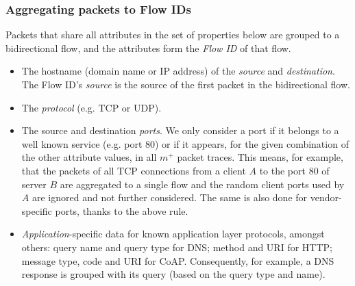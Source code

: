 
\subsubsection{Aggregating packets to Flow IDs}

Packets that share all attributes in the set of properties below are grouped to a bidirectional flow, and the attributes form the \emph{Flow ID} of that flow. %
\begin{itemize}
\item The hostname (domain name or IP address) of the \emph{source} and \emph{destination}. The Flow ID's \emph{source} is the source of the first packet in the bidirectional flow.
\item The \emph{protocol} (e.g. TCP or UDP).
\item The source and destination \emph{ports}. We only consider a port if it belongs to a well known service (e.g. port 80) or if it appears, for the given combination of the other attribute values, in all $m^+$ packet traces. This means, for example, that the packets of all TCP connections from a client $A$ to the port 80 of server $B$ are aggregated to a single flow and the random client ports used by $A$ are ignored and not further considered. The same is also done for vendor-specific ports, thanks to the above rule.
\item \emph{Application}-specific data for known application layer protocols, amongst others: query name and query type for DNS; method and URI for HTTP; message type, code and URI for CoAP. Consequently, for example, a DNS response is grouped with its query (based on the query type and name).
\end{itemize}


